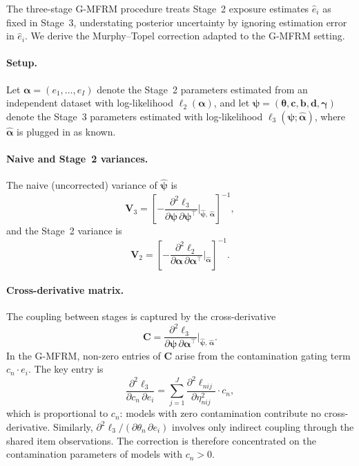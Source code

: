 The three-stage G-MFRM procedure treats Stage~2 exposure estimates $\hat{e}_i$ as fixed in Stage~3, understating posterior uncertainty by ignoring estimation error in $\hat{e}_i$. We derive the Murphy--Topel correction \citep{murphy1985} adapted to the G-MFRM setting.

\paragraph{Setup.} Let $\boldsymbol{\alpha} = (e_1, \ldots, e_I)$ denote the Stage~2 parameters estimated from an independent dataset with log-likelihood $\ell_2(\boldsymbol{\alpha})$, and let $\boldsymbol{\psi} = (\boldsymbol{\theta}, \mathbf{c}, \mathbf{b}, \mathbf{d}, \boldsymbol{\gamma})$ denote the Stage~3 parameters estimated with log-likelihood $\ell_3(\boldsymbol{\psi}; \hat{\boldsymbol{\alpha}})$, where $\hat{\boldsymbol{\alpha}}$ is plugged in as known.

\paragraph{Naive and Stage~2 variances.} The naive (uncorrected) variance of $\hat{\boldsymbol{\psi}}$ is
%
\begin{equation}
\mathbf{V}_3 = \left[-\frac{\partial^2 \ell_3}{\partial \boldsymbol{\psi}\, \partial \boldsymbol{\psi}^\top}\bigg|_{\hat{\boldsymbol{\psi}},\, \hat{\boldsymbol{\alpha}}}\right]^{-1},
\end{equation}
%
and the Stage~2 variance is
%
\begin{equation}
\mathbf{V}_2 = \left[-\frac{\partial^2 \ell_2}{\partial \boldsymbol{\alpha}\, \partial \boldsymbol{\alpha}^\top}\bigg|_{\hat{\boldsymbol{\alpha}}}\right]^{-1}.
\end{equation}

\paragraph{Cross-derivative matrix.} The coupling between stages is captured by the cross-derivative
%
\begin{equation}
\mathbf{C} = \frac{\partial^2 \ell_3}{\partial \boldsymbol{\psi}\, \partial \boldsymbol{\alpha}^\top}\bigg|_{\hat{\boldsymbol{\psi}},\, \hat{\boldsymbol{\alpha}}}.
\end{equation}
%
In the G-MFRM, non-zero entries of $\mathbf{C}$ arise from the contamination gating term $c_n \cdot e_i$. The key entry is
%
\begin{equation}
\frac{\partial^2 \ell_3}{\partial c_n\, \partial e_i} = \sum_{j=1}^{J} \frac{\partial^2 \ell_{nij}}{\partial \eta_{nij}^2} \cdot c_n,
\end{equation}
%
which is proportional to $c_n$: models with zero contamination contribute no cross-derivative. Similarly, $\partial^2 \ell_3 / (\partial \theta_n\, \partial e_i)$ involves only indirect coupling through the shared item observations. The correction is therefore concentrated on the contamination parameters of models with $c_n > 0$.

